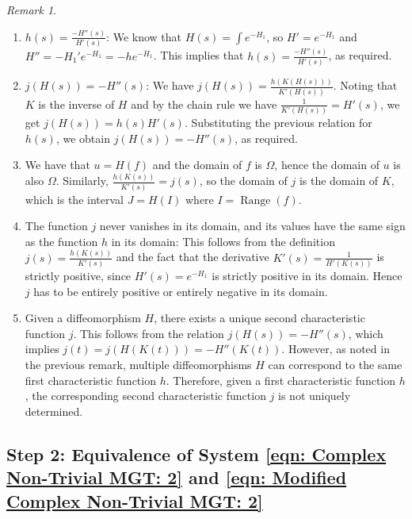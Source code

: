\documentclass[12pt]{article}
\theoremstyle{plain}
\theoremstyle{definition}
\theoremstyle{remark}
\newtheorem{remark}[theorem]{Remark}
\begin{document}
\begin{remark}\label{remark: rln bw 1st and 2nd Char Fns}
	\begin{enumerate}
		\item \(h(s) = \frac{-H''(s)}{H'(s)}\): We know that \(H(s) = \int e^{-H_1}\), so \(H' = e^{-H_1}\) and \(H'' = -H_1' e^{-H_1} = -h e^{-H_1}\). This implies that \(h(s) = \frac{-H''(s)}{H'(s)}\), as required.
				
		\item \(j(H(s)) = -H''(s)\): We have \(j(H(s)) = \frac{h(K(H(s)))}{K'(H(s))}\). Noting that \(K\) is the inverse of \(H\) and by the chain rule we have \(\frac{1}{K'(H(s))} = H'(s)\), we get \(j(H(s)) = h(s) H'(s)\). Substituting the previous relation for \(h(s)\), we obtain \(j(H(s)) = -H''(s)\), as required.
		
		\item We have that \(u = H(f)\) and the domain of \(f\) is \(\Omega\), hence the domain of \(u\) is also \(\Omega\). Similarly, \(\frac{h(K(s))}{K'(s)} = j(s)\), so the domain of \(j\) is the domain of \(K\), which is the interval \(J = H(I)\) where \(I = \operatorname{Range}(f)\).
		
		\item The function \(j\) never vanishes in its domain, and its values have the same sign as the function \(h\) in its domain: This follows from the definition \(j(s) = \frac{h(K(s))}{K'(s)}\) and the fact that the derivative \(K'(s) = \frac{1}{H'(K(s))}\) is strictly positive, since \(H'(s) = e^{-H_1}\) is strictly positive in its domain. Hence \(j\) has to be entirely positive or entirely negative in its domain.
		
		\item Given a diffeomorphism \(H\), there exists a unique second characteristic function \(j\). This follows from the relation \(j(H(s)) = -H''(s)\), which implies \(j(t) = j(H(K(t))) = -H''(K(t))\). However, as noted in the previous remark, multiple diffeomorphisms \(H\) can correspond to the same first characteristic function \(h\). Therefore, given a first characteristic function \(h\), the corresponding second characteristic function \(j\) is not uniquely determined.
	\end{enumerate} 
\end{remark}

  
\subsection{Step 2: Equivalence of System \ref{eqn: Complex Non-Trivial MGT: 2} and \ref{eqn: Modified Complex Non-Trivial MGT: 2}}
\label{section: Step 2}
\end{document}
